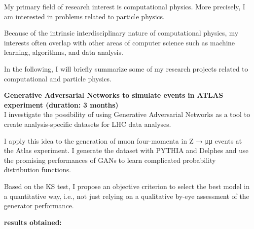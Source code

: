 \documentclass[11pt, a4paper]{awesome-cv}
\begin{document}


\makelettertitle




\begin{cvletter}

My primary field of research interest is computational physics. More precisely, I am interested in problems related to particle physics. 

Because of the intrinsic interdisciplinary nature of computational physics, my interests often overlap with other areas of computer science such as machine learning, algorithms, and data analysis. 

In the following, I will briefly summarize some of my research projects related to computational and particle physics.

\textbf{Generative Adversarial Networks to simulate events in ATLAS experiment (duration: 3 months) 
}\\
I investigate the possibility of using Generative Adversarial Networks as a tool to create analysis-specific datasets for LHC data analyses. 

I apply this idea to the generation of muon four-momenta in Z → μμ events at the Atlas experiment. I generate the dataset with PYTHIA and Delphes and use the promising performances of GANs to learn complicated probability distribution functions.

Based on the KS test, I propose an objective criterion to select the best model in a quantitative way, i.e., not just relying on a qualitative by-eye assessment of the generator performance. 

\textbf{\color{blue} results obtained: }


\end{cvletter}
\end{document}
